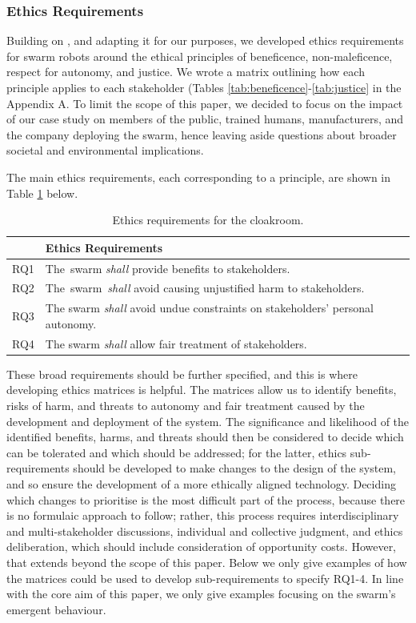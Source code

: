 \documentclass[lettersize,journal]{IEEEtran}
\begin{document}
\subsubsection{Ethics Requirements}\label{ethics-r}
Building on \cite{Porter2022}, and adapting it for our purposes, we developed ethics requirements for swarm robots around the ethical principles of beneficence, non-maleficence, respect for autonomy, and justice. We wrote a matrix outlining how each principle applies to each stakeholder (Tables  \ref{tab:beneficence}-\ref{tab:justice} in the Appendix A. To limit the scope of this paper, we decided to focus on the impact of our case study on members of the public, trained humans, manufacturers, and the company deploying the swarm, hence leaving aside questions about broader societal and environmental implications.

The main ethics requirements, each corresponding to a principle, are shown in Table \ref{tab:ethics} below. 
\begin{table}[!h]
	\centering
	\begin{tabular}{|p{9mm}|p{72mm}|}
		\hline
		& \textbf{ Ethics Requirements} \\
		\hline
		RQ1 & The swarm \textit{shall} provide benefits to stakeholders. \\ 
		\hline
		RQ2 & The swarm \textit{shall} avoid causing unjustified harm to stakeholders. \\ 
		\hline
		RQ3 & The swarm \textit{shall} avoid undue constraints on stakeholders' personal autonomy. \\
		\hline
		RQ4 & The swarm \textit{shall} allow fair treatment of stakeholders.  \\		[1ex] 		
		\hline
	\end{tabular}
	\caption{\label{tab:ethics}Ethics requirements for the cloakroom.}
\end{table}  

These broad requirements should be further specified, and this is where developing ethics matrices is helpful. The matrices allow us to identify benefits, risks of harm, and threats to autonomy and fair treatment caused by the development and deployment of the system. The significance and likelihood of the identified benefits, harms, and threats should then be considered to decide which can be tolerated and which should be addressed; for the latter, ethics sub-requirements should be developed to make changes to the design of the system, and so ensure the development of a more ethically aligned technology. Deciding which changes to prioritise is the most difficult part of the process, because there is no formulaic approach to follow; rather, this process requires interdisciplinary and multi-stakeholder discussions, individual and collective judgment, and ethics deliberation, which should include consideration of opportunity costs. However, that extends beyond the scope of this paper. Below we only give examples of how the matrices could be used to develop sub-requirements to specify RQ1-4. In line with the core aim of this paper, we only give examples focusing on the swarm's emergent behaviour.
\\
\end{document}
